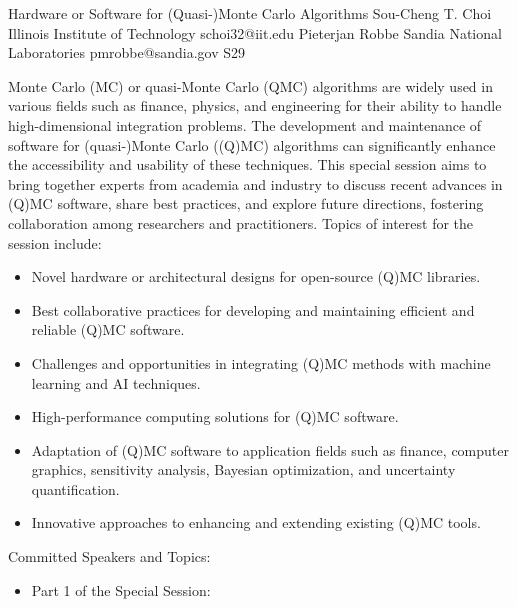 \begin{session}
 {Hardware or Software for (Quasi-)Monte Carlo Algorithms}%
 {Sou-Cheng T.  Choi}%
 {Illinois Institute of Technology}%
 {schoi32@iit.edu}%
 {Pieterjan Robbe}%
 {Sandia National Laboratories}%
 {pmrobbe@sandia.gov}%
 {S29}%
 {}%

 Monte Carlo (MC) or quasi-Monte Carlo (QMC) algorithms are widely used in various fields such as finance, physics, and engineering for their ability to handle high-dimensional integration problems. The development and maintenance of software for (quasi-)Monte Carlo ((Q)MC) algorithms can significantly enhance the accessibility and usability of these techniques. This special session aims to bring together experts from academia and industry to discuss recent advances in (Q)MC software, share best practices, and explore future directions, fostering collaboration among researchers and practitioners.
 Topics of interest for the session include:
 \begin{itemize}
 \item Novel hardware or architectural designs for open-source (Q)MC libraries.
 \item Best collaborative practices for developing and maintaining efficient and reliable (Q)MC software.
 \item Challenges and opportunities in integrating (Q)MC methods with machine learning and AI techniques.
 \item High-performance computing solutions for (Q)MC software.
 \item Adaptation of (Q)MC software to application fields such as finance, computer graphics, sensitivity analysis, Bayesian optimization, and uncertainty quantification.
 \item Innovative approaches to enhancing and extending existing (Q)MC tools.
 \end{itemize}
 Committed Speakers and Topics:
 \begin{itemize}
 \item Part 1 of the Special Session:

\end{itemize}
\end{session}

